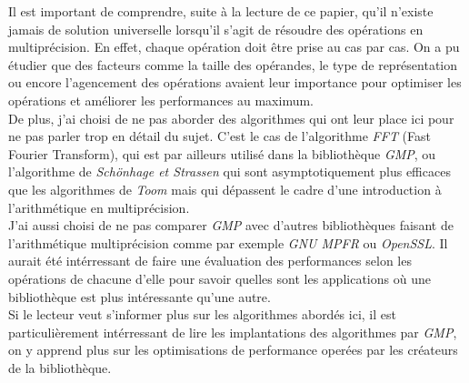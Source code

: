 \documentclass[letterpaper]{article}
\begin{document}
Il est important de comprendre, suite à la lecture de ce papier, qu'il n'existe
jamais de solution universelle lorsqu'il s'agit de résoudre des opérations en
multiprécision. En effet, chaque opération doit être prise au cas par
cas. On a pu étudier que des facteurs comme la taille des opérandes, le type de
représentation ou encore l'agencement des opérations avaient leur importance
pour optimiser les opérations et améliorer les performances au maximum.\\

De plus, j'ai choisi de ne pas aborder des algorithmes qui ont leur place
ici pour ne pas parler trop en détail du sujet. C'est le cas de l'algorithme
\emph{FFT} (Fast Fourier Transform), qui est par ailleurs utilisé dans
la bibliothèque \emph{GMP}, ou l'algorithme de \emph{Schönhage et Strassen} qui
sont asymptotiquement plus efficaces que les algorithmes de \emph{Toom} mais
qui dépassent le cadre d'une introduction à l'arithmétique en multiprécision.\\

J'ai aussi choisi de ne pas comparer \emph{GMP} avec d'autres bibliothèques
faisant de l'arithmétique multiprécision comme par exemple \emph{GNU MPFR} ou
\emph{OpenSSL}. Il aurait été intérressant de faire une évaluation des
performances selon les opérations de chacune d'elle pour savoir quelles sont les
applications où une bibliothèque est plus intéressante qu'une autre.\\

Si le lecteur veut s'informer plus sur les algorithmes abordés ici, il est
particulièrement intérressant de lire les implantations des algorithmes par
\emph{GMP}, on y apprend plus sur les optimisations de performance
operées par les créateurs de la bibliothèque.

\footnotesize



\end{document}
